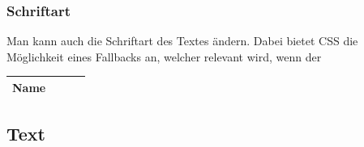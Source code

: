 \documentclass{article}
\begin{document}
\begin{itemize}
		\subsubsection{Schriftart}
		Man kann auch die Schriftart des Textes ändern. Dabei bietet CSS die Möglichkeit eines Fallbacks an, welcher relevant wird, wenn der

	\end{itemize}
	\newpage
	\begin{tabular}{| l | l | l |}
		\toprule
		Name &  & & & \\ \midrule
		
		\bottomrule
	\end{tabular}
	\subsection{Text}





















  
\end{document}
